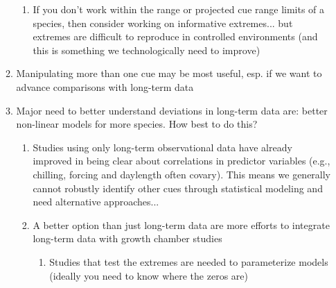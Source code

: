 \documentclass[11pt,letterpaper]{article}
\begin{document}
\begin{enumerate}
\begin{enumerate}
\begin{enumerate}
\item If you don't work within the range or projected cue range limits of a species, then consider working on informative extremes... but extremes are difficult to reproduce in controlled environments (and this is something we technologically need to improve)
\end{enumerate}
\item Manipulating more than one cue may be most useful, esp. if we want to advance comparisons with long-term data
\item Major need to better understand deviations in long-term data are: better non-linear models for more species. How best to do this?
\begin{enumerate}
\item Studies using only long-term observational data have already improved in being clear about correlations in predictor variables (e.g., chilling, forcing and daylength often covary). This means we generally cannot robustly identify other cues through statistical modeling and need alternative approaches... %
\item A better option than just long-term data are more efforts to integrate long-term data with growth chamber studies \citep{Caffarra:2011qf,nagano2012,satake2013,ford2016,chuinearees} %
\begin{enumerate}
\item Studies that test the extremes are needed to parameterize models (ideally you need to know where the zeros are) \citep{chuinearees} %

\end{enumerate}
\end{enumerate}
\end{enumerate}
\end{enumerate}
\end{document}
